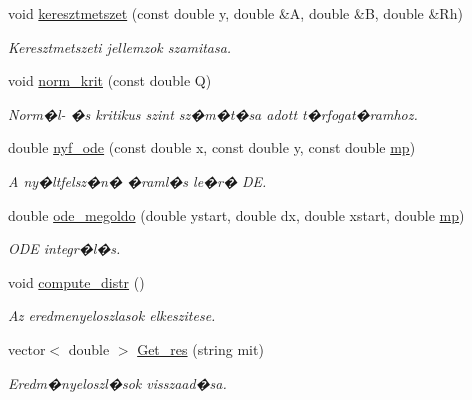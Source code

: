 \begin{DoxyCompactItemize}
void \hyperlink{class_csatorna_ab9528187fc3d40d210c85b72d7856f10}{keresztmetszet} (const double y, double \&A, double \&B, double \&Rh)
\begin{DoxyCompactList}\small\item\em Keresztmetszeti jellemzok szamitasa. \end{DoxyCompactList}\item 
\hypertarget{class_csatorna_af30a5d124d26bd31548cf243c4a95178}{}\label{class_csatorna_af30a5d124d26bd31548cf243c4a95178} 
void \hyperlink{class_csatorna_af30a5d124d26bd31548cf243c4a95178}{norm\+\_\+krit} (const double Q)
\begin{DoxyCompactList}\small\item\em Norm�l-\/ �s kritikus szint sz�m�t�sa adott t�rfogat�ramhoz. \end{DoxyCompactList}\item 
double \hyperlink{class_csatorna_aacea0461de03c4592e89cee026c2e1d5}{nyf\+\_\+ode} (const double x, const double y, const double \hyperlink{class_agelem_a1377d80d8511cc4adacccba31d28282d}{mp})
\begin{DoxyCompactList}\small\item\em A ny�ltfelsz�n� �raml�s le�r� DE. \end{DoxyCompactList}\item 
double \hyperlink{class_csatorna_a17e55cbde88d58985f7e315e7069ba3a}{ode\+\_\+megoldo} (double ystart, double dx, double xstart, double \hyperlink{class_agelem_a1377d80d8511cc4adacccba31d28282d}{mp})
\begin{DoxyCompactList}\small\item\em O\+DE integr�l�s. \end{DoxyCompactList}\item 
void \hyperlink{class_csatorna_a2ad82029529f1aa2b4da3122b608eb6c}{compute\+\_\+distr} ()
\begin{DoxyCompactList}\small\item\em Az eredmenyeloszlasok elkeszitese. \end{DoxyCompactList}\item 
\hypertarget{class_csatorna_ab515ee9bcf30c35c22b23fd0617cc422}{}\label{class_csatorna_ab515ee9bcf30c35c22b23fd0617cc422} 
vector$<$ double $>$ \hyperlink{class_csatorna_ab515ee9bcf30c35c22b23fd0617cc422}{Get\+\_\+res} (string mit)
\begin{DoxyCompactList}\small\item\em Eredm�nyeloszl�sok visszaad�sa. \end{DoxyCompactList}\item 

\end{DoxyCompactItemize}
